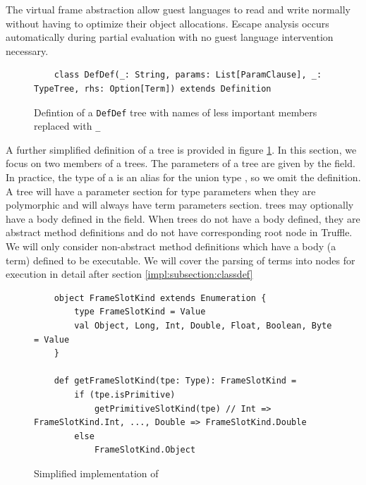 The virtual frame abstraction allow guest languages to read and write normally without having to optimize their object allocations.
Escape analysis occurs automatically during partial evaluation with no guest language intervention necessary. 

\begin{figure}[!htb]
	\begin{verbatim}
	class DefDef(_: String, params: List[ParamClause], _: TypeTree, rhs: Option[Term]) extends Definition	
	\end{verbatim}
	\caption{Defintion of a \texttt{DefDef} tree with names of less important members replaced with \texttt{\_}}
	\label{recall:defdef}
\end{figure}

A further simplified definition of a  tree is provided in figure \ref{recall:defdef}.
In this section, we focus on two members of a  trees.
The parameters of a  tree are given by the  field.
In practice, the type of a  is an alias for the union type , so we omit the  definition.
A  tree will have a parameter section for type parameters when they are polymorphic and will always have term parameters section.
 trees may optionally have a body defined in the  field.
When trees do not have a body defined, they are abstract method definitions and do not have corresponding root node in Truffle.
We will only consider non-abstract method definitions which have a body (a term) defined to be executable.
We will cover the parsing of terms into nodes for execution in detail after section \ref{impl:subsection:classdef}

\begin{figure}[!htb]
	\begin{verbatim}
	object FrameSlotKind extends Enumeration {
		type FrameSlotKind = Value
		val Object, Long, Int, Double, Float, Boolean, Byte = Value
	}	
		
	def getFrameSlotKind(tpe: Type): FrameSlotKind = 
		if (tpe.isPrimitive) 
			getPrimitiveSlotKind(tpe) // Int => FrameSlotKind.Int, ..., Double => FrameSlotKind.Double
		else  
			FrameSlotKind.Object
	\end{verbatim}
	\caption{Simplified implementation of }
	\label{impl:frameslot-kind}
\end{figure}

